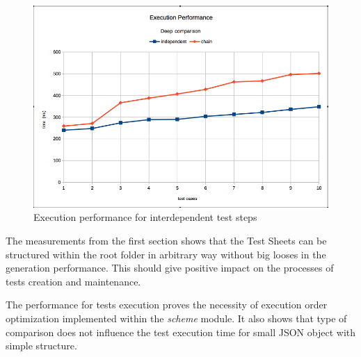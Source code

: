 \begin{figure}[ht]
	\label{fig:ef}
	\centering
	\includegraphics[width=\textwidth]{grafiken/exec_deep}
	\caption{Execution performance for interdependent test steps}
\end{figure}

The measurements from the first section shows that the Test Sheets can be structured within the root folder in arbitrary way without big looses in the generation performance. This should give positive impact on the processes of tests creation and maintenance.

The performance for tests execution proves the necessity of execution order optimization implemented within the \textit{scheme} module. It also shows that type of comparison does not influence the test execution time for small JSON object with simple structure.
